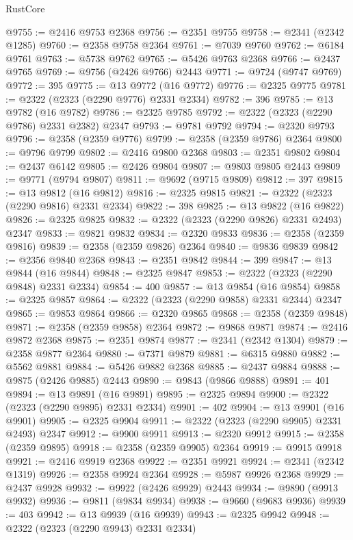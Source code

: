 \begin{lexlean}{RustCore}
\begin{coremodule}
@9755 := @2416 @9753 @2368
@9756 := @2351 @9755
@9758 := @2341 (@2342 @1285)
@9760 := @2358 @9758 @2364
@9761 := @7039 @9760
@9762 := @6184 @9761
@9763 := @5738 @9762
@9765 := @5426 @9763 @2368
@9766 := @2437 @9765
@9769 := @9756 (@2426 @9766) @2443
@9771 := @9724 (@9747 @9769)
@9772 := 395
@9775 := @13 @9772 (@16 @9772)
@9776 := @2325 @9775
@9781 := @2322 (@2323 (@2290 @9776) @2331 @2334)
@9782 := 396
@9785 := @13 @9782 (@16 @9782)
@9786 := @2325 @9785
@9792 := @2322 (@2323 (@2290 @9786) @2331 @2382) @2347
@9793 := @9781 @9792
@9794 := @2320 @9793
@9796 := @2358 (@2359 @9776)
@9799 := @2358 (@2359 @9786) @2364
@9800 := @9796 @9799
@9802 := @2416 @9800 @2368
@9803 := @2351 @9802
@9804 := @2437 @6142
@9805 := @2426 @9804
@9807 := @9803 @9805 @2443
@9809 := @9771 (@9794 @9807)
@9811 := @9692 (@9715 @9809)
@9812 := 397
@9815 := @13 @9812 (@16 @9812)
@9816 := @2325 @9815
@9821 := @2322 (@2323 (@2290 @9816) @2331 @2334)
@9822 := 398
@9825 := @13 @9822 (@16 @9822)
@9826 := @2325 @9825
@9832 := @2322 (@2323 (@2290 @9826) @2331 @2493) @2347
@9833 := @9821 @9832
@9834 := @2320 @9833
@9836 := @2358 (@2359 @9816)
@9839 := @2358 (@2359 @9826) @2364
@9840 := @9836 @9839
@9842 := @2356 @9840 @2368
@9843 := @2351 @9842
@9844 := 399
@9847 := @13 @9844 (@16 @9844)
@9848 := @2325 @9847
@9853 := @2322 (@2323 (@2290 @9848) @2331 @2334)
@9854 := 400
@9857 := @13 @9854 (@16 @9854)
@9858 := @2325 @9857
@9864 := @2322 (@2323 (@2290 @9858) @2331 @2344) @2347
@9865 := @9853 @9864
@9866 := @2320 @9865
@9868 := @2358 (@2359 @9848)
@9871 := @2358 (@2359 @9858) @2364
@9872 := @9868 @9871
@9874 := @2416 @9872 @2368
@9875 := @2351 @9874
@9877 := @2341 (@2342 @1304)
@9879 := @2358 @9877 @2364
@9880 := @7371 @9879
@9881 := @6315 @9880
@9882 := @5562 @9881
@9884 := @5426 @9882 @2368
@9885 := @2437 @9884
@9888 := @9875 (@2426 @9885) @2443
@9890 := @9843 (@9866 @9888)
@9891 := 401
@9894 := @13 @9891 (@16 @9891)
@9895 := @2325 @9894
@9900 := @2322 (@2323 (@2290 @9895) @2331 @2334)
@9901 := 402
@9904 := @13 @9901 (@16 @9901)
@9905 := @2325 @9904
@9911 := @2322 (@2323 (@2290 @9905) @2331 @2493) @2347
@9912 := @9900 @9911
@9913 := @2320 @9912
@9915 := @2358 (@2359 @9895)
@9918 := @2358 (@2359 @9905) @2364
@9919 := @9915 @9918
@9921 := @2416 @9919 @2368
@9922 := @2351 @9921
@9924 := @2341 (@2342 @1319)
@9926 := @2358 @9924 @2364
@9928 := @5987 @9926 @2368
@9929 := @2437 @9928
@9932 := @9922 (@2426 @9929) @2443
@9934 := @9890 (@9913 @9932)
@9936 := @9811 (@9834 @9934)
@9938 := @9660 (@9683 @9936)
@9939 := 403
@9942 := @13 @9939 (@16 @9939)
@9943 := @2325 @9942
@9948 := @2322 (@2323 (@2290 @9943) @2331 @2334)

\end{coremodule}
\end{lexlean}

